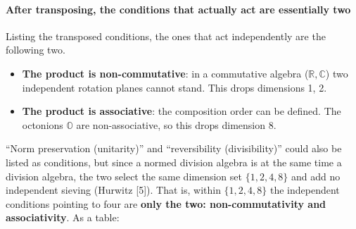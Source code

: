 \documentclass[
]{article}
\providecommand{\tightlist}{%
  \setlength{\itemsep}{0pt}\setlength{\parskip}{0pt}}
\begin{document}
\paragraph{After transposing, the conditions that actually act are
essentially
two}\label{after-transposing-the-conditions-that-actually-act-are-essentially-two}

Listing the transposed conditions, the ones that act independently are
the following two.

\begin{itemize}
\tightlist
\item
  \textbf{The product is non-commutative}: in a commutative algebra
  (\(\mathbb{R}, \mathbb{C}\)) two independent rotation planes cannot
  stand. This drops dimensions 1, 2.
\item
  \textbf{The product is associative}: the composition order can be
  defined. The octonions \(\mathbb{O}\) are non-associative, so this
  drops dimension 8.
\end{itemize}

``Norm preservation (unitarity)'' and ``reversibility (divisibility)''
could also be listed as conditions, but since a normed division algebra
is at the same time a division algebra, the two select the same
dimension set \(\{1,2,4,8\}\) and add no independent sieving (Hurwitz
{[}5{]}). That is, within \(\{1,2,4,8\}\) the independent conditions
pointing to four are \textbf{only the two: non-commutativity and
associativity}. As a table:
\end{document}
